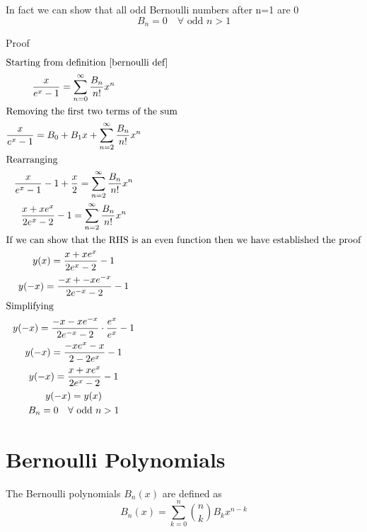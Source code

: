 \documentclass[a4paper]{article}
\begin{document}
    \begin{theorem}
        In fact we can show that all odd Bernoulli numbers after n=1 are 0
        \begin{equation}
            \label{eq:odd-bernoulli} B_n = 0  \quad \forall \text{ odd }n > 1
        \end{equation}

        Proof
        \begin{gather*}
            \intertext{Starting from definition~\ref{bernoulli def}}
            \frac{x}{e^x -1} = \sum_{n=0}^{\infty} \frac{B_n}{n!} x^n
            \\
            \intertext{Removing the first two terms of the sum}
            \frac{x}{e^x -1} = B_0 + B_1 x + \sum_{n=2}^{\infty} \frac{B_n}{n!} x^n\\
            \intertext{Rearranging}
            \frac{x}{e^x -1}  - 1 + \frac{x}{2}= \sum_{n=2}^{\infty} \frac{B_n}{n!} x^n
            \\
            \frac{x + xe^x}{2e^x -2}  - 1 = \sum_{n=2}^{\infty} \frac{B_n}{n!} x^n
            \\
            \intertext{If we can show that the RHS is an even function then we have established the proof}
            y(x) = \frac{x + xe^x}{2e^x -2}  - 1
            \\
            y(-x) = \frac{-x + -xe^{-x}}{2e^{-x} -2}  - 1
            \\
            \intertext{Simplifying}
            y(-x) = \frac{-x -xe^{-x}}{2e^{-x} -2} \cdot \frac{e^x}{e^x}  - 1
            \\
            y(-x) = \frac{-xe^x -x}{2 -2e^x}  - 1
            \\
            y(-x) = \frac{x+xe^x}{2e^x - 2}  - 1
            \\
            y(-x) = y(x)
            \\
            B_n = 0  \quad \forall \text{ odd }n > 1
        \end{gather*}
    \end{theorem}

    \pagebreak


    \section{Bernoulli Polynomials}\label{sec:bernoulli-polynomials}
    \begin{definition}
        \label{bernoulli poly def}
        The Bernoulli polynomials $B_n(x)$ are defined as
        \[\boxed{
            B_{n}(x) = \sum_{k=0}^{n} {n \choose k} B_k x^{n-k}
        }\]
    \end{definition}
\end{document}
